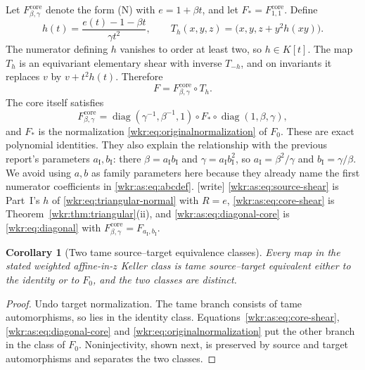 \documentclass[11pt,a4paper]{article}
\numberwithin{equation}{section}
\newtheorem{corollary}[theorem]{Corollary}
\theoremstyle{definition}
\theoremstyle{remark}
\newcommand{\diag}{\operatorname{diag}}
\begin{document}
Let $F_{\beta,\gamma}^{\mathrm{core}}$ denote the form (N) with
$e=1+\beta t$, and let $F_*=F_{1,1}^{\mathrm{core}}$. Define
\begin{equation}\label{wkr:as:eq:source-shear}
h(t)=\frac{e(t)-1-\beta t}{\gamma t^2},\qquad
T_h(x,y,z)=\bigl(x,y,z+y^2h(xy)\bigr).
\end{equation}
The numerator defining $h$ vanishes to order at least two, so
$h\in K[t]$. The map $T_h$ is an equivariant elementary shear with
inverse $T_{-h}$, and on invariants it replaces $v$ by $v+t^2h(t)$.
Therefore
\begin{equation}\label{wkr:as:eq:core-shear}
F=F_{\beta,\gamma}^{\mathrm{core}}\circ T_h.
\end{equation}
The core itself satisfies
\begin{equation}\label{wkr:as:eq:diagonal-core}
F_{\beta,\gamma}^{\mathrm{core}}
=\diag(\gamma^{-1},\beta^{-1},1)
\circ F_*\circ\diag(1,\beta,\gamma),
\end{equation}
and $F_*$ is the normalization \eqref{wkr:eq:originalnormalization} of
$F_0$. These are exact polynomial identities. They also explain the
relationship with the previous report's parameters $a_{\mathrm I},
b_{\mathrm I}$: there $\beta=a_{\mathrm I}b_{\mathrm I}$ and
$\gamma=a_{\mathrm I}b_{\mathrm I}^2$, so
$a_{\mathrm I}=\beta^2/\gamma$ and $b_{\mathrm I}=\gamma/\beta$. We avoid
using $a,b$ as family parameters here because they already name the first
numerator coefficients in \eqref{wkr:as:eq:abcdef}.
\textup{[write]} \eqref{wkr:as:eq:source-shear} is Part~I's $h$ of
\eqref{wkr:eq:triangular-normal} with $R=e$, \eqref{wkr:as:eq:core-shear}
is Theorem~\ref{wkr:thm:triangular}(ii), and \eqref{wkr:as:eq:diagonal-core}
is \eqref{wkr:eq:diagonal} with $F^{\mathrm{core}}_{\beta,\gamma}=
F_{a_{\mathrm I},b_{\mathrm I}}$.

\begin{corollary}[Two tame source--target equivalence classes]
\label{wkr:as:cor:twoclasses}
Every map in the stated weighted affine-in-$z$ Keller class is tame
source--target equivalent either to the identity or to $F_0$, and the two
classes are distinct.
\end{corollary}
\begin{proof}
Undo target normalization. The tame branch consists of tame
automorphisms, so lies in the identity class.
Equations~\eqref{wkr:as:eq:core-shear}, \eqref{wkr:as:eq:diagonal-core}
and \eqref{wkr:eq:originalnormalization} put the other branch in the class
of $F_0$. Noninjectivity, shown next, is preserved by source and target
automorphisms and separates the two classes.
\end{proof}
\end{document}
